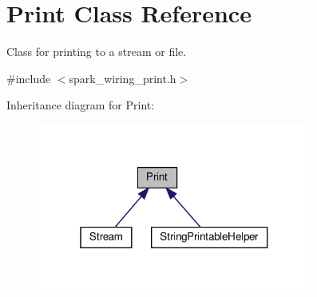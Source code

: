 \hypertarget{class_print}{}\section{Print Class Reference}
\label{class_print}


Class for printing to a stream or file.  




{\ttfamily \#include $<$spark\+\_\+wiring\+\_\+print.\+h$>$}



Inheritance diagram for Print\+:
\nopagebreak
\begin{figure}[H]
\begin{center}
\leavevmode
\includegraphics[width=256pt]{class_print__inherit__graph}
\end{center}
\end{figure}
